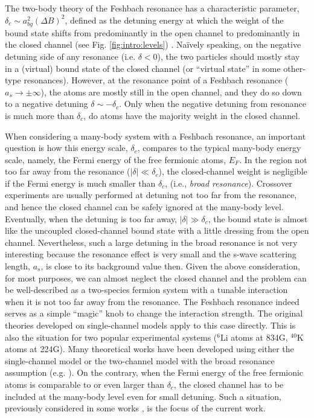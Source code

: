 \documentclass[reprint,pra]{revtex4-1}
\providecommand{\abs}[1]{\ensuremath{\left\lvert{#1}\right\rvert}}
\begin{document}
  The two-body theory of the Feshbach resonance has a characteristic  parameter, $\delta_c\sim{}a_{bg}^2(\Delta{B})^2$, defined as  the detuning energy at which the weight of the bound state shifts from predominantly in the open channel to predominantly in the closed channel (see Fig. \ref{fig:intro:levels}) \cite{Leggett}.  Na\"{i}vely speaking, on the negative detuning side of any resonance (i.e. $\delta<0$), the two particles should mostly stay  in a (virtual) bound state of the closed channel (or ``virtual state'' in some other-type resonances).  However, at the resonance point  of a Feshbach resonance ($a_s\to\pm\infty$), the atoms are mostly still in the open channel, and they do so down to a negative detuning $\delta\sim-\delta_c$. Only when the negative detuning from resonance is much more  than $\delta_c$, do atoms have the majority weight in the closed channel.    
  
  When considering a many-body system with a Feshbach resonance, an important question is how this energy scale, $\delta_c$, compares to the typical many-body energy scale, namely, the Fermi energy of the free fermionic atoms, $E_F$. In the region not too far away from the resonance ($\abs{\delta}\ll\delta_{c}$), the closed-channel weight is negligible if the Fermi energy is much smaller than $\delta_c$, (i.e., \emph{broad resonance}).  Crossover experiments are usually performed at detuning not too far from the resonance, and hence the closed channel can be safely ignored at the many-body level. Eventually, when the detuning is too far away, $\abs{\delta}\gg\delta_{c}$, the bound state is almost like the    uncoupled closed-channel bound state with a little dressing from the open channel.  
  Nevertheless, such a large detuning in the broad resonance is not very interesting because the  resonance effect is very small and the s-wave scattering length, $a_s$, is close to its background  value then.  
 Given the above consideration, for most purposes, we can almost neglect the closed channel  and the problem can be well-described as a two-species fermion system with a tunable interaction when it is not too far away from the resonance.  The Feshbach resonance indeed serves as a simple ``magic'' knob to change the interaction strength.  The original  theories developed on  single-channel models  apply to this case directly.  This is also the situation for two  popular experimental systems (${}^{6}\text{Li}$ atoms at 834G, $^{40}\text{K}$ atoms at 224G).   Many theoretical works have been developed using either the single-channel model or  the two-channel model with the broad resonance assumption (e.g. \cite{Holland01,HoUniversal,Fuchs04}). On the contrary, when the Fermi energy of the free fermionic atoms is  comparable to or even larger than $\delta_c$, the closed channel has to be included at the many-body level even for small detuning. Such a situation, previously considered in some works \cite{JacksonNarrow,GurarieNarrow}, is the focus of the current work.
  
\end{document}
